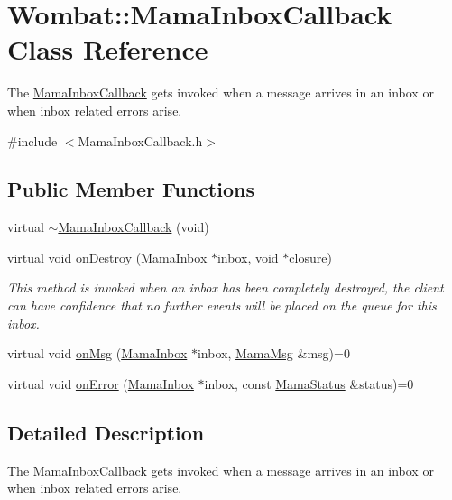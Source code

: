 \hypertarget{classWombat_1_1MamaInboxCallback}{
\section{Wombat::MamaInboxCallback Class Reference}
\label{classWombat_1_1MamaInboxCallback}
}


The \hyperlink{classWombat_1_1MamaInboxCallback}{MamaInboxCallback} gets invoked when a message arrives in an inbox or when inbox related errors arise.  


{\ttfamily \#include $<$MamaInboxCallback.h$>$}\subsection*{Public Member Functions}
\begin{DoxyCompactItemize}
\item 
virtual \hyperlink{classWombat_1_1MamaInboxCallback_a1badebc408c69ff79d1e2889e090e46b}{$\sim$MamaInboxCallback} (void)
\item 
virtual void \hyperlink{classWombat_1_1MamaInboxCallback_a44bb84d0fd2f693f01dbe816cfbae691}{onDestroy} (\hyperlink{classWombat_1_1MamaInbox}{MamaInbox} $\ast$inbox, void $\ast$closure)
\begin{DoxyCompactList}\small\item\em This method is invoked when an inbox has been completely destroyed, the client can have confidence that no further events will be placed on the queue for this inbox. \item\end{DoxyCompactList}\item 
virtual void \hyperlink{classWombat_1_1MamaInboxCallback_aba5c3925173822c110bc32bf564acdd3}{onMsg} (\hyperlink{classWombat_1_1MamaInbox}{MamaInbox} $\ast$inbox, \hyperlink{classWombat_1_1MamaMsg}{MamaMsg} \&msg)=0
\item 
virtual void \hyperlink{classWombat_1_1MamaInboxCallback_a4b932f6ae51dea6a919a6058f1f52ae9}{onError} (\hyperlink{classWombat_1_1MamaInbox}{MamaInbox} $\ast$inbox, const \hyperlink{classWombat_1_1MamaStatus}{MamaStatus} \&status)=0
\end{DoxyCompactItemize}


\subsection{Detailed Description}
The \hyperlink{classWombat_1_1MamaInboxCallback}{MamaInboxCallback} gets invoked when a message arrives in an inbox or when inbox related errors arise. 

